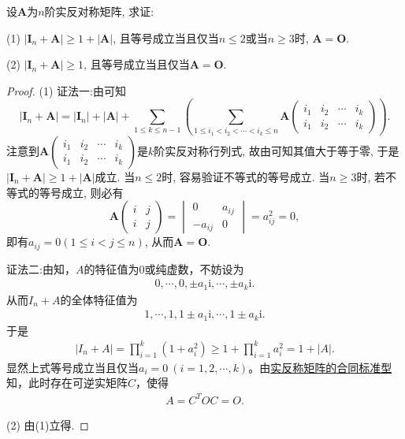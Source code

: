 \documentclass[../../main.tex]{subfiles}
\begin{document}
\begin{proposition}\label{proposition:反称矩阵A的I_n+A的行列式相关结论}
设$\boldsymbol{A}$为$n$阶实反对称矩阵, 求证:

(1) $|\boldsymbol{I}_n+\boldsymbol{A}|\geqslant  1 + |\boldsymbol{A}|$, 且等号成立当且仅当$n\leqslant  2$或当$n\geqslant  3$时, $\boldsymbol{A}=\boldsymbol{O}$.

(2) $|\boldsymbol{I}_n+\boldsymbol{A}|\geqslant  1$, 且等号成立当且仅当$\boldsymbol{A}=\boldsymbol{O}$.
\end{proposition}
\begin{proof}
(1) {\color{blue}证法一:}由可知
\[
|\boldsymbol{I}_n+\boldsymbol{A}| = |\boldsymbol{I}_n|+|\boldsymbol{A}|+\sum_{1\leqslant  k\leqslant  n - 1}\left(\sum_{1\leqslant  i_1 < i_2 < \cdots < i_k\leqslant  n} \boldsymbol{A}\begin{pmatrix}
i_1 & i_2 & \cdots & i_k \\
i_1 & i_2 & \cdots & i_k
\end{pmatrix}\right).
\]
注意到$\boldsymbol{A}\begin{pmatrix}
i_1 & i_2 & \cdots & i_k \\
i_1 & i_2 & \cdots & i_k
\end{pmatrix}$是$k$阶实反对称行列式, 故由可知其值大于等于零, 于是$|\boldsymbol{I}_n+\boldsymbol{A}|\geqslant  1 + |\boldsymbol{A}|$成立. 当$n\leqslant  2$时, 容易验证不等式的等号成立. 当$n\geqslant  3$时, 若不等式的等号成立, 则必有
\[
\boldsymbol{A}\begin{pmatrix}
i & j \\
i & j
\end{pmatrix}=\begin{vmatrix}
0 & a_{ij} \\
-a_{ij} & 0
\end{vmatrix}=a_{ij}^2 = 0,
\]
即有$a_{ij} = 0 (1\leqslant  i < j\leqslant  n)$, 从而$\boldsymbol{A}=\boldsymbol{O}$.

{\color{blue}证法二:}由知，$A$的特征值为$0$或纯虚数，不妨设为
\begin{align*}
0, \cdots, 0, \pm a_1\mathrm{i}, \cdots, \pm a_k\mathrm{i}.
\end{align*}
从而$I_n + A$的全体特征值为
\begin{align*}
1, \cdots, 1, 1 \pm a_1\mathrm{i}, \cdots, 1 \pm a_k\mathrm{i}.
\end{align*}
于是
\begin{align*}
|I_n + A| = \prod_{i=1}^k (1 + a_i^2) \geqslant 1 + \prod_{i=1}^k a_i^2 = 1 + |A|.
\end{align*}
显然上式等号成立当且仅当$a_i = 0\ (i = 1,2,\cdots,k)$。由\hyperref[theorem:反对称矩阵的合同标准型]{实反称矩阵的合同标准型}知，此时存在可逆实矩阵$C$，使得
\begin{align*}
A = C^T O C = O.
\end{align*}

(2) 由(1)立得.

\end{proof}
\end{document}
